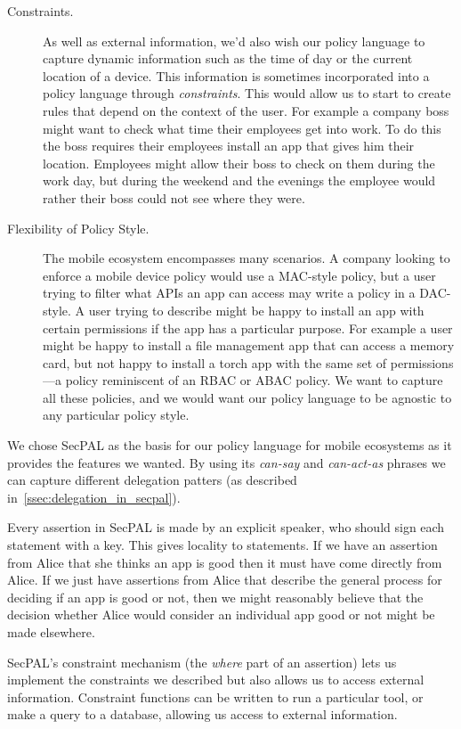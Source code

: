 \documentclass[thesis.tex]{subfiles}
\begin{document}
\begin{description}
\item[Constraints.] As well as external information, we'd also wish
our policy language to capture dynamic information such as the time of
day or the current location of a device. This information is sometimes
incorporated into a policy language through \emph{constraints}. This
would allow us to start to create rules that depend on the context of
the user. For example a company boss might want to check what time
their employees get into work. To do this the boss requires their
employees install an app that gives him their location. Employees
might allow their boss to check on them during the work day, but
during the weekend and the evenings the employee would rather their
boss could not see where they were.

\item[Flexibility of Policy Style.] The mobile ecosystem encompasses
many scenarios. A company looking to enforce a mobile device
policy would use a MAC-style policy, but a user trying to filter what
APIs an app can access may write a policy in a DAC-style. A user
trying to describe might be happy to install an app with certain
permissions if the app has a particular purpose. For example a user
might be happy to install a file management app that can access a
memory card, but not happy to install a torch app with the same set
of permissions---a policy reminiscent of an RBAC or ABAC policy. We
want to capture all these policies, and we would want our policy
language to be agnostic to any particular policy style.
\end{description}

We chose SecPAL as the basis for our policy language for mobile ecosystems as it
provides the features we wanted. By using its \emph{can-say} and
\emph{can-act-as} phrases we can capture different delegation patters (as
described in~\autoref{ssec:delegation_in_secpal}).

Every assertion in SecPAL is made by an explicit speaker, who should sign each
statement with a key. This gives locality to statements. If we have an assertion
from Alice that she thinks an app is good then it must have come directly from
Alice. If we just have assertions from Alice that describe the general process
for deciding if an app is good or not, then we might reasonably believe that the
decision whether Alice would consider an individual app good or not might
be made elsewhere.

SecPAL's constraint mechanism (the \emph{where} part of an assertion) lets us
implement the constraints we described but also allows us to access external
information. Constraint functions can be written to run a particular tool, or
make a query to a database, allowing us access to external information.
\end{document}
